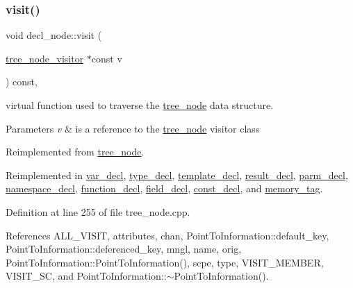 \subsubsection{\texorpdfstring{visit()}{visit()}}
{\footnotesize\ttfamily void decl\+\_\+node\+::visit (\begin{DoxyParamCaption}\item[{\hyperlink{classtree__node__visitor}{tree\+\_\+node\+\_\+visitor} $\ast$const}]{v }\end{DoxyParamCaption}) const\hspace{0.3cm}{\ttfamily [override]}, {\ttfamily [virtual]}}



virtual function used to traverse the \hyperlink{classtree__node}{tree\+\_\+node} data structure. 


\begin{DoxyParams}{Parameters}
{\em v} & is a reference to the \hyperlink{classtree__node}{tree\+\_\+node} visitor class \\
\hline
\end{DoxyParams}


Reimplemented from \hyperlink{classtree__node_aa9abba3f1b30e0be80b4a56b188c6ecc}{tree\+\_\+node}.



Reimplemented in \hyperlink{structvar__decl_ad28f066d3483ec9ca4b7839c1af19c6f}{var\+\_\+decl}, \hyperlink{structtype__decl_a6c09e2072a083c2625e79de59006f7e6}{type\+\_\+decl}, \hyperlink{structtemplate__decl_a38f7c267485cd3aaefda2f7f49132af1}{template\+\_\+decl}, \hyperlink{structresult__decl_a139725df13e7c33ae94f604d42aa708e}{result\+\_\+decl}, \hyperlink{structparm__decl_ac4757bda05ed450b912bfa0b3ed6bc6c}{parm\+\_\+decl}, \hyperlink{structnamespace__decl_a4870e54b688ed2ab60c49d03c4362ecb}{namespace\+\_\+decl}, \hyperlink{structfunction__decl_a49389fd3c1df13bb78dbc94e7350462e}{function\+\_\+decl}, \hyperlink{structfield__decl_a68ef82bb50b2ebdaa89d1702aa01065e}{field\+\_\+decl}, \hyperlink{structconst__decl_a50bf1b7d73f36fdb7c5036eba097f97e}{const\+\_\+decl}, and \hyperlink{structmemory__tag_a9dec2571221222773939c1629db2267b}{memory\+\_\+tag}.



Definition at line 255 of file tree\+\_\+node.\+cpp.



References A\+L\+L\+\_\+\+V\+I\+S\+IT, attributes, chan, Point\+To\+Information\+::default\+\_\+key, Point\+To\+Information\+::deferenced\+\_\+key, mngl, name, orig, Point\+To\+Information\+::\+Point\+To\+Information(), scpe, type, V\+I\+S\+I\+T\+\_\+\+M\+E\+M\+B\+ER, V\+I\+S\+I\+T\+\_\+\+SC, and Point\+To\+Information\+::$\sim$\+Point\+To\+Information().



